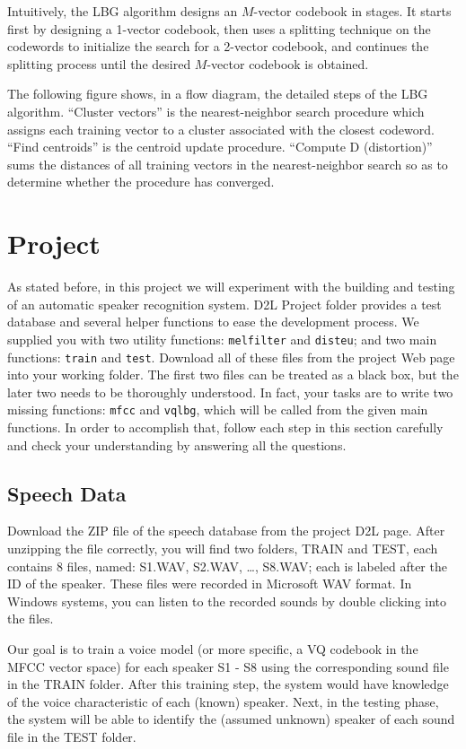 \documentclass{article}
\begin{document}
Intuitively, the LBG algorithm designs an $M$-vector codebook in stages.  It starts first by designing a 1-vector codebook, then uses a splitting technique on the codewords to initialize the search for a 2-vector codebook, and continues the splitting process until the desired $M$-vector codebook is obtained.

The following figure shows, in a flow diagram, the detailed steps of the LBG algorithm.  “Cluster vectors” is the nearest-neighbor search procedure which assigns each training vector to a cluster associated with the closest codeword.  “Find centroids” is the centroid update procedure.  “Compute D (distortion)” sums the distances of all training vectors in the nearest-neighbor search so as to determine whether the procedure has converged.

\section{Project}
As stated before, in this project we will experiment with the building and testing of an automatic speaker recognition system. D2L Project folder provides a test database and several helper functions to ease the development process.   We supplied you with two utility functions: \texttt{melfilter} and \texttt{disteu}; and two main functions: \texttt{train} and \texttt{test}. Download all of these files from the project Web page into your working folder.  The first two files can be treated as a black box, but the later two needs to be thoroughly understood.  In fact, your tasks are to write two missing functions: \texttt{mfcc} and \texttt{vqlbg}, which will be called from the given main functions.  In order to accomplish that, follow each step in this section carefully and check your understanding by answering all the questions.

\subsection{Speech Data}
Download the ZIP file of the speech database from the project D2L page. After unzipping the file correctly, you will find two folders, TRAIN and TEST, each contains 8 files, named: S1.WAV, S2.WAV, …, S8.WAV; each is labeled after the ID of the speaker.  These files were recorded in Microsoft WAV format.  In Windows systems, you can listen to the recorded sounds by double clicking into the files.

Our goal is to train a voice model (or more specific, a VQ codebook in the MFCC vector space) for each speaker S1 - S8 using the corresponding sound file in the TRAIN folder.  After this training step, the system would have knowledge of the voice characteristic of each (known) speaker.   Next, in the testing phase, the system will be able to identify the (assumed unknown) speaker of each sound file in the TEST folder.
\end{document}
